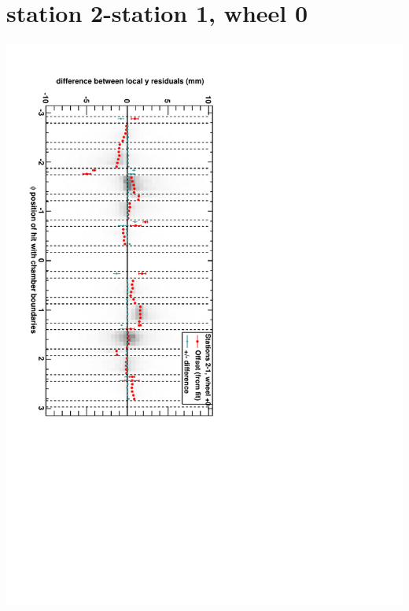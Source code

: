 \documentclass[compress]{beamer}
\begin{document}
\section*{station 2-station 1, wheel 0}
\begin{frame} \vfill \mbox{\hspace{-1 cm}\includegraphics[height=1.2\linewidth, angle=90]{DTzdiff12VsPhi_whC_slope.pdf}} \end{frame}
\end{document}
